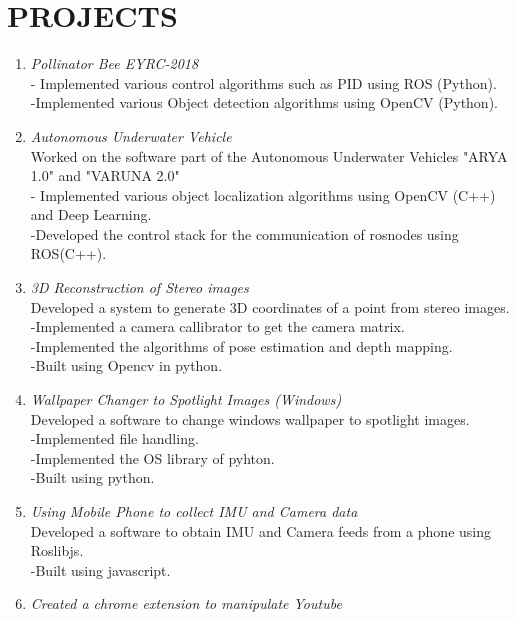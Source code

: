 \documentclass[margin]{res}
\begin{document}
\section{PROJECTS } \begin{enumerate}
 \item  {\large{\sl Pollinator Bee EYRC-2018}}\\
        - Implemented various control algorithms such as PID using ROS (Python).\\
        -Implemented various Object detection algorithms using OpenCV (Python).\\

  \item  {\large{\sl Autonomous Underwater Vehicle}}\\
Worked on the software part of the Autonomous Underwater Vehicles "ARYA 1.0" and "VARUNA 2.0"\\
        - Implemented various object localization algorithms using OpenCV (C++) and Deep Learning.\\
        -Developed the control stack for the communication of rosnodes using ROS(C++).\\
\item {\large{\sl 3D Reconstruction of Stereo images}}\\
 Developed a system to generate 3D coordinates of a point from stereo images.\\
  	-Implemented a camera callibrator to get the camera matrix.\\
	-Implemented the algorithms of pose estimation and depth mapping.\\
	-Built using Opencv in python.\\
\item {\large{\sl Wallpaper Changer to Spotlight Images (Windows)}}\\
 Developed a software to change windows wallpaper to spotlight images.\\
  	-Implemented file handling.\\
	-Implemented the OS library of pyhton.\\
	-Built using python.\\
\item {\large{\sl Using Mobile Phone to collect IMU and Camera data}}\\
 Developed a software to obtain IMU and Camera feeds from a phone using Roslibjs.\\
  	-Built using javascript.\\
\item {\large{\sl Created a chrome extension to manipulate Youtube}}\\

\end{enumerate}
\end{document}
